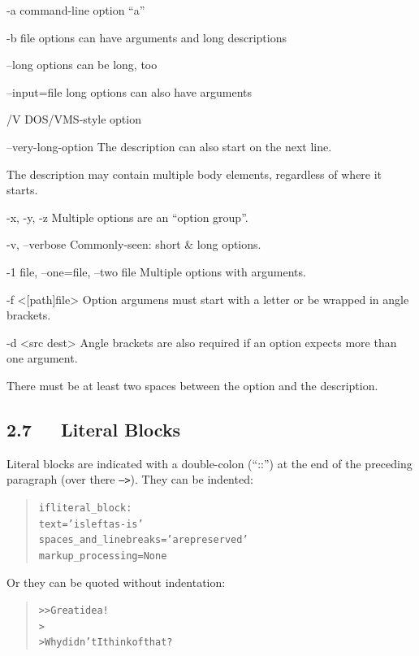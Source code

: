 \documentclass[a4paper]{article}
\begin{document}
\begin{DUoptionlist}
\item[-a]  command-line option “a”
\item[-b file]  options can have arguments
and long descriptions
\item[--long]  options can be long, too
\item[--input=file]  long options can also have arguments
\item[/V]  DOS/VMS-style option
\item[--very-long-option]  The description can also start on the next line.

The description may contain multiple body elements,
regardless of where it starts.
\item[-x, -y, -z]  Multiple options are an “option group”.
\item[-v, --verbose]  Commonly-seen: short \& long options.
\item[-1 file, --one=file, --two file]  Multiple options with arguments.
\item[-f <{[}path{]}file>]  Option argumens must start with a letter
or be wrapped in angle brackets.
\item[-d <src dest>]  Angle brackets are also required if an
option expects more than one argument.
\end{DUoptionlist}

There must be at least two spaces between the option and the
description.


\subsection{2.7   Literal Blocks%
  \label{literal-blocks}%
}

Literal blocks are indicated with a double-colon (“::”) at the end of
the preceding paragraph (over there \texttt{-->}).  They can be indented:

\begin{quote}
\begin{alltt}
if literal_block:
    text = 'is left as-is'
    spaces_and_linebreaks = 'are preserved'
    markup_processing = None
\end{alltt}
\end{quote}

Or they can be quoted without indentation:

\begin{quote}
\begin{alltt}
>> Great idea!
>
> Why didn't I think of that?
\end{alltt}
\end{quote}
\end{document}
